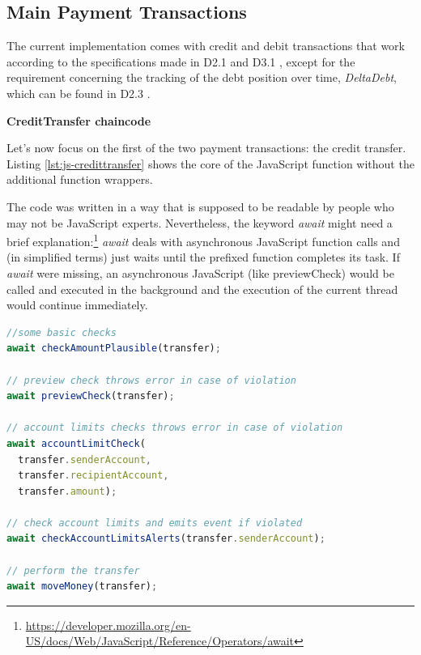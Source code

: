 \subsection{Main Payment Transactions}
\label{subsec:main-payment-transactions}
The current implementation comes with credit and debit transactions that work according to the specifications made in D2.1 \cite{INTERLACE_D21} and D3.1 \cite{INTERLACE_D31}, except for the requirement concerning the tracking of the debt position over time, \textit{DeltaDebt}, which can be found in D2.3 \cite{INTERLACE_D23}.

\textbf{CreditTransfer chaincode}

Let's now focus on the first of the two payment transactions: the credit transfer. Listing \ref{lst:js-credittransfer} shows the core of the JavaScript function without the additional function wrappers.

The code was written in a way that is supposed to be readable by people who may not be JavaScript experts. Nevertheless, the keyword \textit{await} might  need a brief explanation:\footnote{\url{https://developer.mozilla.org/en-US/docs/Web/JavaScript/Reference/Operators/await}} \textit{await} deals with asynchronous JavaScript function calls and (in simplified terms) just waits until the prefixed function completes its task. If \textit{await} were missing, an asynchronous JavaScript (like previewCheck) would be called and executed in the background and the execution of the current thread would continue immediately.

\begin{center}
\begin{minipage}{0.8\textwidth}
\small
\begin{lstlisting}[language=javascript,firstnumber=1,caption={\bf\small CreditTransfer JavaScript}, captionpos=b,label=lst:js-credittransfer]
//some basic checks
await checkAmountPlausible(transfer);

// preview check throws error in case of violation
await previewCheck(transfer);

// account limits checks throws error in case of violation
await accountLimitCheck(
  transfer.senderAccount,
  transfer.recipientAccount,
  transfer.amount);

// check account limits and emits event if violated
await checkAccountLimitsAlerts(transfer.senderAccount);

// perform the transfer
await moveMoney(transfer);
\end{lstlisting}
\end{minipage}
\end{center}

